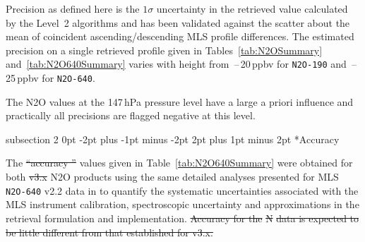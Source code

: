 \documentclass[11pt,draft]{report}
\makeatletter
\renewcommand{\subsection}{\@startsection%
  {subsection}%
  {2}%
  {0pt}%
  {-2pt plus -1pt minus -2pt}%
  {2pt plus 1pt minus 2pt}%
  {\large\sffamily\fontseries{sb}\selectfont\flushleft\color{SectionColor}\figureversion{tabular}}}%
\providecommand{\DIFaddtex}[1]{{\protect\color{blue}\uwave{#1}}} %
\providecommand{\DIFdeltex}[1]{{\protect\color{red}\sout{#1}}}                      %
\providecommand{\DIFaddbegin}{} %
\providecommand{\DIFaddend}{} %
\providecommand{\DIFdelbegin}{} %
\providecommand{\DIFdelend}{} %
\providecommand{\DIFadd}[1]{\texorpdfstring{\DIFaddtex{#1}}{#1}} %
\providecommand{\DIFdel}[1]{\texorpdfstring{\DIFdeltex{#1}}{}} %
\makeatother
\begin{document}
Precision as defined here is the $1\sigma$ uncertainty in the retrieved
value calculated by the Level~2 algorithms and has been validated
against the scatter about the mean of coincident ascending/descending
MLS profile differences.  The estimated precision on a single retrieved
profile given in Tables~\ref{tab:N2OSummary} and~\ref{tab:N2O640Summary}
varies with height from \,--\,20\,ppbv for \texttt{N2O-190} and
\,--\,25\,ppbv for \texttt{N2O-640}.

The N\cs2O values at the 147\,hPa pressure level have a large a priori
influence and practically all precisions are flagged negative at this
level.

\subsection*{Accuracy}

The \DIFdelbegin \DIFdel{``accuracy '' }\DIFdelend \DIFaddbegin \DIFadd{accuracy }\DIFaddend values given in Table~\ref{tab:N2O640Summary} were obtained
for both \DIFdelbegin \DIFdel{v3.x }\DIFdelend \DIFaddbegin \DIFadd{v4 }\DIFaddend N\cs2O products using the same detailed analyses presented
for MLS \texttt{N2O-640} v2.2 data in \citet{LambertEtal07} to quantify
the systematic uncertainties associated with the MLS instrument
calibration, spectroscopic uncertainty and approximations in the
retrieval formulation and implementation.
\DIFdelbegin \DIFdel{Accuracy for the }%
\DIFdel{N}%
\DIFdel{data is 
expected to be little different from that established for v3.x. 
}\DIFdelend 
\end{document}
